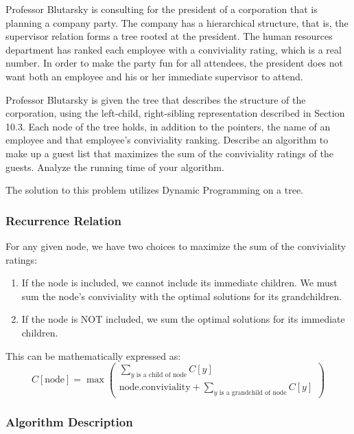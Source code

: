 \item[\textbf{Problem 14-6}]
Professor Blutarsky is consulting for the president of a corporation that is
planning a company party. The company has a hierarchical structure, that is, the
supervisor relation forms a tree rooted at the president. The human resources
department has ranked each employee with a conviviality rating, which is a real
number. In order to make the party fun for all attendees, the president does not
want both an employee and his or her immediate supervisor to attend.

Professor Blutarsky is given the tree that describes the structure of the
corporation, using the left-child, right-sibling representation described in
Section 10.3. Each node of the tree holds, in addition to the pointers, the name
of an employee and that employee's conviviality ranking. Describe an algorithm
to make up a guest list that maximizes the sum of the conviviality ratings of
the guests. Analyze the running time of your algorithm. 

\Solution

The solution to this problem utilizes Dynamic Programming on a tree.

\subsubsection*{Recurrence Relation}
For any given node, we have two choices to maximize the sum of the conviviality
ratings:
\begin{enumerate}
    \item If the node is included, we cannot include its immediate children. We
    must sum the node's conviviality with the optimal solutions for its
    grandchildren.

    \item If the node is NOT included, we sum the optimal solutions for its
    immediate children.
\end{enumerate}

This can be mathematically expressed as:
$$
    C[\text{node}] = \max
    \begin{pmatrix} 
        \displaystyle \sum_{y \text{ is a child of } \text{node}} C[y]                                 \\[2em] 
        \displaystyle \text{node.conviviality} + \sum_{y \text{ is a grandchild of } \text{node}} C[y] 
    \end{pmatrix}
$$

\subsubsection*{Algorithm Description}

